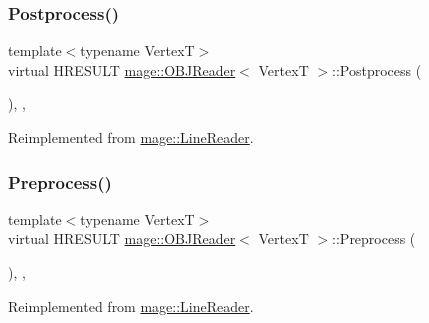 \hypertarget{classmage_1_1_o_b_j_reader_a99bc512fd79fb46a688869db6edf5704}{}\label{classmage_1_1_o_b_j_reader_a99bc512fd79fb46a688869db6edf5704} 
\subsubsection{\texorpdfstring{Postprocess()}{Postprocess()}}
{\footnotesize\ttfamily template$<$typename VertexT$>$ \\
virtual H\+R\+E\+S\+U\+LT \hyperlink{classmage_1_1_o_b_j_reader}{mage\+::\+O\+B\+J\+Reader}$<$ VertexT $>$\+::Postprocess (\begin{DoxyParamCaption}{ }\end{DoxyParamCaption})\hspace{0.3cm}{\ttfamily [override]}, {\ttfamily [private]}, {\ttfamily [virtual]}}



Reimplemented from \hyperlink{classmage_1_1_line_reader_a4c8f2e1a60c6f3c98b4b47f3019c24f3}{mage\+::\+Line\+Reader}.

\hypertarget{classmage_1_1_o_b_j_reader_adf891ce9b0634f10d6698b88ed3f8d16}{}\label{classmage_1_1_o_b_j_reader_adf891ce9b0634f10d6698b88ed3f8d16} 
\subsubsection{\texorpdfstring{Preprocess()}{Preprocess()}}
{\footnotesize\ttfamily template$<$typename VertexT$>$ \\
virtual H\+R\+E\+S\+U\+LT \hyperlink{classmage_1_1_o_b_j_reader}{mage\+::\+O\+B\+J\+Reader}$<$ VertexT $>$\+::Preprocess (\begin{DoxyParamCaption}{ }\end{DoxyParamCaption})\hspace{0.3cm}{\ttfamily [override]}, {\ttfamily [private]}, {\ttfamily [virtual]}}



Reimplemented from \hyperlink{classmage_1_1_line_reader_a9a67c9527f499f19489f0680caa66ac9}{mage\+::\+Line\+Reader}.

\hypertarget{classmage_1_1_o_b_j_reader_a66080ff8e84d61c421e455ae9bf63414}{}\label{classmage_1_1_o_b_j_reader_a66080ff8e84d61c421e455ae9bf63414} 

